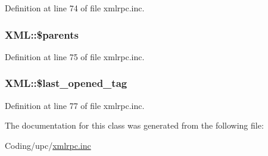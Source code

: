 Definition at line 74 of file xmlrpc.inc.\hypertarget{classXML_c10be009a77c59e80ce5562d4dd35532}{
\subsubsection{\setlength{\rightskip}{0pt plus 5cm}XML::\$parents}}
\label{classXML_c10be009a77c59e80ce5562d4dd35532}




Definition at line 75 of file xmlrpc.inc.\hypertarget{classXML_60e7e74df6643f50e0c6ea8252554b3d}{
\subsubsection{\setlength{\rightskip}{0pt plus 5cm}XML::\$last\_\-opened\_\-tag}}
\label{classXML_60e7e74df6643f50e0c6ea8252554b3d}




Definition at line 77 of file xmlrpc.inc.

The documentation for this class was generated from the following file:\begin{CompactItemize}
\item 
Coding/upc/\hyperlink{xmlrpc_8inc}{xmlrpc.inc}\end{CompactItemize}
